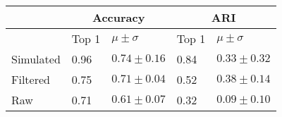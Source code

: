 \begin{tabular}{lllll}
\toprule
{} & \multicolumn{2}{c}{Accuracy} &   \multicolumn{2}{c}{ARI} \\
\midrule
{} & Top 1 & $\mu \pm \sigma$ & Top 1 & $\mu \pm \sigma$ \\
Simulated &  0.96 &  $0.74 \pm 0.16 $  & 0.84 &  $0.33 \pm 0.32 $\\
Filtered  & 0.75 &  $0.71 \pm 0.04 $ & 0.52 &  $0.38 \pm 0.14 $\\
Raw & 0.71 &  $0.61 \pm 0.07 $ &  0.32 &  $0.09 \pm 0.10 $   \\
\bottomrule
\end{tabular}